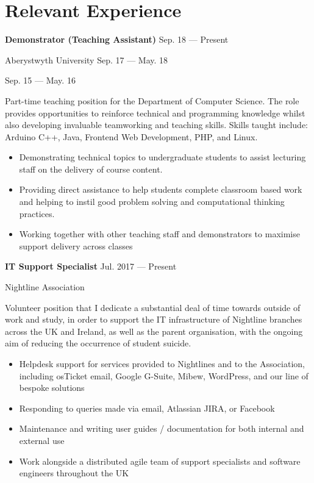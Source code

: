 \section{Relevant Experience}
\parbox[t][][t]{\linewidth}{
	\parbox{\linewidth}{{\textbf{Demonstrator (Teaching Assistant)}
		\hfill {{Sep. 18 --- Present}}}}
	\parbox{\linewidth}{{Aberystwyth University
		\hfill {{Sep. 17 --- May. 18}}}}
		\parbox{\linewidth}{{
			\hfill {{Sep. 15 --- May. 16}}}}
	\smallbreak
	
	\bigskip
	Part-time teaching position for the Department of Computer Science. The role provides opportunities to reinforce technical and programming knowledge
	whilst also developing invaluable teamworking and teaching skills. Skills taught include: Arduino C++, Java, Frontend Web Development, PHP, and Linux.
			
	\bigskip
	\begin{itemize}
		\item{Demonstrating technical topics to undergraduate students to assist lecturing staff on the delivery of course content.}\\[-.6em]
		\item{Providing direct assistance to help students complete classroom based work and helping to instil good problem solving and computational thinking practices.}\\[-.6em]
		\item{Working together with other teaching staff and demonstrators to maximise support delivery across classes}\\[-.6em]
	\end{itemize}
	\bigskip
	\bigskip
}

\parbox[t][][t]{\linewidth}{
	\parbox{\linewidth}{{\textbf{IT Support Specialist}}
	\hfill {{Jul. 2017 --- Present}}}
	\smallbreak

	\parbox{\linewidth}{Nightline Association}

	\bigskip
	Volunteer position that I dedicate a substantial deal of time towards outside of work and study, in order to support the IT infrastructure of Nightline branches across the UK and Ireland, as well as the parent organisation, with the ongoing aim of reducing the occurrence of student suicide.
		
	\bigskip
	\begin{itemize}
		\item{Helpdesk support for services provided to Nightlines and to the Association, including osTicket email, Google G-Suite, Mibew, WordPress, and our line of bespoke solutions}\\[-.6em]
		\item{Responding to queries made via email, Atlassian JIRA, or Facebook}\\[-.6em]
		\item{Maintenance and writing user guides / documentation for both internal and external use}\\[-.6em]
		\item{Work alongside a distributed agile team of support specialists and software engineers throughout the UK}\\[-.6em]
	\bigskip
	\bigskip
	\end{itemize}
}

